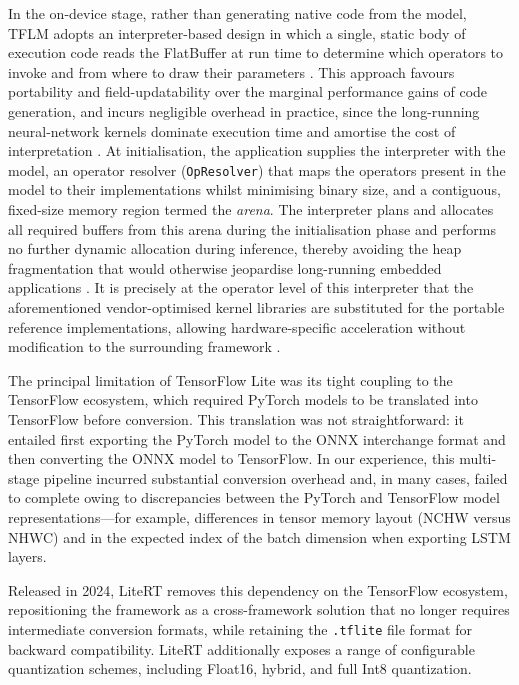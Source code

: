 \documentclass[12pt,DIV16,BCOR12mm,a4paper,footinclude=false,headinclude,parskip=half-,twoside,openright,cleardoublepage=empty,toc=index,bibliography=totoc,listof=totoc]{scrreprt}
\numberwithin{equation}{chapter}
\begin{document}
  In the on-device stage, rather than generating native code from the model, TFLM
  adopts an interpreter-based design in which a single, static body of execution code
  reads the FlatBuffer at run time to determine which operators to invoke and from
  where to draw their parameters \cite{davidTensorFlowLiteMicro2021}. This approach
  favours portability and field-updatability over the marginal performance gains of
  code generation, and incurs negligible overhead in practice, since the long-running
  neural-network kernels dominate execution time and amortise the cost of
  interpretation \cite{davidTensorFlowLiteMicro2021}. At initialisation, the application
  supplies the interpreter with the model, an operator resolver (\texttt{OpResolver})
  that maps the operators present in the model to their implementations whilst
  minimising binary size, and a contiguous, fixed-size memory region termed the
  \emph{arena}. The interpreter plans and allocates all required buffers from this arena
  during the initialisation phase and performs no further dynamic allocation during
  inference, thereby avoiding the heap fragmentation that would otherwise jeopardise
  long-running embedded applications \cite{davidTensorFlowLiteMicro2021}. It is precisely
  at the operator level of this interpreter that the aforementioned vendor-optimised
  kernel libraries are substituted for the portable reference implementations, allowing
  hardware-specific acceleration without modification to the surrounding framework
  \cite{davidTensorFlowLiteMicro2021}.

  The principal limitation of TensorFlow Lite was its tight coupling to the
  TensorFlow ecosystem, which required PyTorch models to be translated into
  TensorFlow before conversion. This translation was not straightforward: it
  entailed first exporting the PyTorch model to the ONNX interchange format and then
  converting the ONNX model to TensorFlow. In our experience, this multi-stage
  pipeline incurred substantial conversion overhead and, in many cases, failed to
  complete owing to discrepancies between the PyTorch and TensorFlow model
  representations---for example, differences in tensor memory layout (NCHW versus
  NHWC) and in the expected index of the batch dimension when exporting LSTM layers.

  Released in 2024, LiteRT removes this dependency on the TensorFlow ecosystem,
  repositioning the framework as a cross-framework solution that no longer requires
  intermediate conversion formats, while retaining the \texttt{.tflite} file format
  for backward compatibility. LiteRT additionally exposes a range of configurable
  quantization schemes, including Float16, hybrid, and full Int8 quantization.
  
\end{document}
